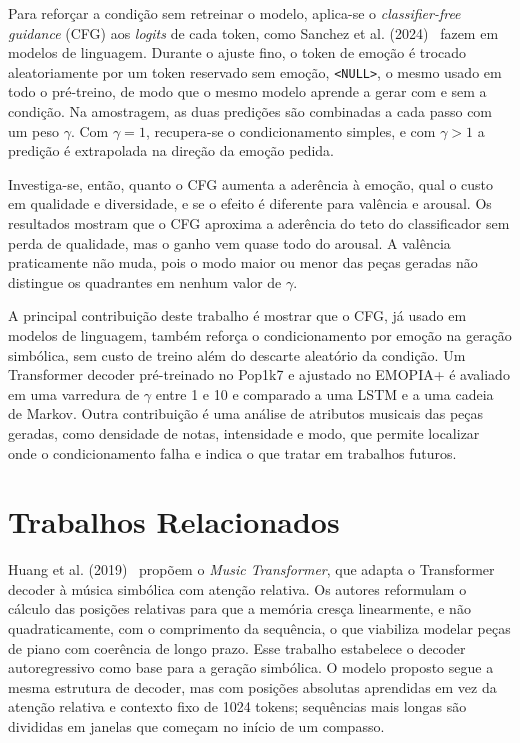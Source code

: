 \documentclass{article}
\begin{document}
Para reforçar a condição sem retreinar o modelo, aplica-se o
\emph{classifier-free guidance} (CFG) aos \emph{logits} de cada token, como
Sanchez et al. (2024)~\cite{Sanchez2024:cfg} fazem em modelos de linguagem.
Durante o ajuste fino, o token de emoção é trocado aleatoriamente por um token
reservado sem emoção, \texttt{<NULL>}, o mesmo usado em todo o pré-treino, de
modo que o mesmo modelo aprende a gerar com e sem a condição. Na amostragem, as
duas predições são combinadas a cada passo com um peso $\gamma$. Com
$\gamma = 1$, recupera-se o condicionamento simples, e com $\gamma > 1$ a
predição é extrapolada na direção da emoção pedida.

Investiga-se, então, quanto o CFG aumenta a aderência à emoção, qual o custo em
qualidade e diversidade, e se o efeito é diferente para valência e arousal. Os
resultados mostram que o CFG aproxima a aderência do teto do classificador sem
perda de qualidade, mas o ganho vem quase todo do arousal. A valência
praticamente não muda, pois o modo maior ou menor das peças geradas não
distingue os quadrantes em nenhum valor de $\gamma$.

A principal contribuição deste trabalho é mostrar que o CFG, já usado em modelos
de linguagem, também reforça o condicionamento por emoção na geração simbólica,
sem custo de treino além do descarte aleatório da condição. Um Transformer
decoder pré-treinado no Pop1k7 e ajustado no EMOPIA+ é avaliado em uma varredura
de $\gamma$ entre 1 e 10 e comparado a uma LSTM e a uma cadeia de Markov. Outra
contribuição é uma análise de atributos musicais das peças geradas, como
densidade de notas, intensidade e modo, que permite localizar onde o
condicionamento falha e indica o que tratar em trabalhos futuros.

\section{Trabalhos Relacionados}\label{sec:related}

Huang et al. (2019)~\cite{Huang2019:musictransformer} propõem o
\emph{Music Transformer}, que adapta o Transformer decoder à música simbólica
com atenção relativa. Os autores reformulam o cálculo das posições relativas
para que a memória cresça linearmente, e não quadraticamente, com o comprimento
da sequência, o que viabiliza modelar peças de piano com coerência de longo
prazo. Esse trabalho estabelece o decoder autoregressivo como base para a
geração simbólica. O modelo proposto segue a mesma estrutura de decoder, mas com
posições absolutas aprendidas em vez da atenção relativa e contexto fixo de 1024
tokens; sequências mais longas são divididas em janelas que começam no início de
um compasso.
\end{document}
